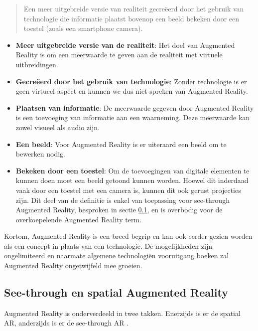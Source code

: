 \documentclass[pdftex,a4paper,12pt,twoside]{report}
\begin{document}
 \begin{quote}
  Een meer uitgebreide versie van realiteit gecre\"eerd door het gebruik van technologie die informatie plaatst bovenop een beeld bekeken door een toestel (zoals een smartphone camera).
 \end{quote}
\begin{itemize}
  \item \textbf{Meer uitgebreide versie van de realiteit}: Het doel van Augmented Reality is om een meerwaarde te geven aan de realiteit met virtuele uitbreidingen.
	\item \textbf{Gecre\"eerd door het gebruik van technologie}: Zonder technologie is er geen virtueel aspect en kunnen we dus niet spreken van Augmented Reality.
	\item \textbf{Plaatsen van informatie}: De meerwaarde gegeven door Augmented Reality is een toevoeging van informatie aan een waarneming. Deze meerwaarde kan zowel visueel als audio zijn.
	\item \textbf{Een beeld}: Voor Augmented Reality is er uiteraard een beeld om te bewerken nodig.
	\item \textbf{Bekeken door een toestel}: Om de toevoegingen van digitale elementen te kunnen doen moet een beeld getoond kunnen worden. Hoewel dit inderdaad vaak door een toestel met een camera is, kunnen dit ook gerust projecties zijn. Dit deel van de definitie is enkel van toepassing voor see-through Augmented Reality, besproken in sectie \ref{sec:spatial}, en is overbodig voor de overkoepelende Augmented Reality term.
\end{itemize}

Kortom, Augmented Reality is een breed begrip en kan ook eerder gezien worden als een concept in plaats van een technologie. De mogelijkheden zijn ongelimiteerd en naarmate algemene technologi\"en vooruitgang boeken zal Augmented Reality ongetwijfeld mee groeien.	\\

\subsection{See-through en spatial Augmented Reality}
\label{sec:spatial}
Augmented Reality is onderverdeeld in twee takken. Enerzijds is er de spatial AR, anderzijds is er de see-through AR \citep{milgram1995augmented}.
\end{document}
